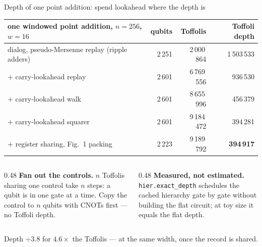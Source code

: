 \documentclass[aspectratio=169,11pt]{beamer}
\begin{document}
\setcounter{framenumber}{197}
\begin{frame}{Depth of one point addition: spend lookahead where the depth is}
  \centering\footnotesize
  \renewcommand{\arraystretch}{1.12}
  \begin{tabular}{@{}lrrr@{}}
    \toprule
    one windowed point addition, $n=256$, $w=16$ & qubits & Toffolis & Toffoli depth \\
    \midrule
    dialog, pseudo-Mersenne replay (ripple adders) & 2\,251 & 2\,000\,864 & 1\,503\,533 \\
    \quad $+$ carry-lookahead replay & 2\,601 & 6\,769\,556 & 936\,530 \\
    \quad $+$ carry-lookahead walk & 2\,601 & 8\,655\,996 & 456\,379 \\
    \quad $+$ carry-lookahead squarer & 2\,601 & 9\,184\,472 & 394\,281 \\
    \quad $+$ register sharing, Fig.~1 packing & 2\,223 & 9\,189\,792 & \textbf{394\,917} \\
    \bottomrule
  \end{tabular}\par
  \vskip3mm
  \raggedright
  \begin{columns}[T]
    \begin{column}{0.48\textwidth}
      \small \textbf{Fan out the controls.} $n$ Toffolis sharing one control take $n$ steps: a qubit is in one gate at a time. Copy the control to $n$ qubits with CNOTs first --- no Toffoli depth.
    \end{column}
    \begin{column}{0.48\textwidth}
      \small \textbf{Measured, not estimated.} \texttt{hier.exact\_depth} schedules the cached hierarchy gate by gate without building the flat circuit; at toy size it equals the flat depth.
    \end{column}
  \end{columns}
  \begin{takeaway}Depth $\div3.8$ for $4.6\times$ the Toffolis --- at the same width, once the record is shared.\end{takeaway}
\end{frame}
\end{document}
